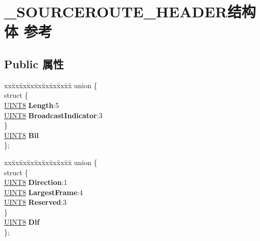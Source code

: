 \hypertarget{struct___s_o_u_r_c_e_r_o_u_t_e___h_e_a_d_e_r}{}\section{\+\_\+\+S\+O\+U\+R\+C\+E\+R\+O\+U\+T\+E\+\_\+\+H\+E\+A\+D\+E\+R结构体 参考}
\label{struct___s_o_u_r_c_e_r_o_u_t_e___h_e_a_d_e_r}
\subsection*{Public 属性}
\begin{DoxyCompactItemize}
\item 
\mbox{\label{struct___s_o_u_r_c_e_r_o_u_t_e___h_e_a_d_e_r_a494501f98902278ef2ca78aeda1ffc44}} 
\begin{tabbing}
xx\=xx\=xx\=xx\=xx\=xx\=xx\=xx\=xx\=\kill
union \{\\
\mbox{\label{union___s_o_u_r_c_e_r_o_u_t_e___h_e_a_d_e_r_1_1_0D2618_a84d74bb927c8ec08e98a32ad4d28e2be}} 
\>struct \{\\
\>\>\hyperlink{_processor_bind_8h_ab27e9918b538ce9d8ca692479b375b6a}{UINT8} {\bfseries Length}:5\\
\>\>\hyperlink{_processor_bind_8h_ab27e9918b538ce9d8ca692479b375b6a}{UINT8} {\bfseries BroadcastIndicator}:3\\
\>\} \\
\>\hyperlink{_processor_bind_8h_ab27e9918b538ce9d8ca692479b375b6a}{UINT8} {\bfseries Bil}\\
\}; \\

\end{tabbing}\item 
\mbox{\label{struct___s_o_u_r_c_e_r_o_u_t_e___h_e_a_d_e_r_aee82ea2c9a7b607080f9026c84bc57b5}} 
\begin{tabbing}
xx\=xx\=xx\=xx\=xx\=xx\=xx\=xx\=xx\=\kill
union \{\\
\mbox{\label{union___s_o_u_r_c_e_r_o_u_t_e___h_e_a_d_e_r_1_1_0D2620_acf49fc93bf442045273033f522cfdd7c}} 
\>struct \{\\
\>\>\hyperlink{_processor_bind_8h_ab27e9918b538ce9d8ca692479b375b6a}{UINT8} {\bfseries Direction}:1\\
\>\>\hyperlink{_processor_bind_8h_ab27e9918b538ce9d8ca692479b375b6a}{UINT8} {\bfseries LargestFrame}:4\\
\>\>\hyperlink{_processor_bind_8h_ab27e9918b538ce9d8ca692479b375b6a}{UINT8} {\bfseries Reserved}:3\\
\>\} \\
\>\hyperlink{_processor_bind_8h_ab27e9918b538ce9d8ca692479b375b6a}{UINT8} {\bfseries Dlf}\\
\}; \\


\end{tabbing}
\end{DoxyCompactItemize}
